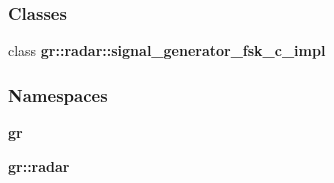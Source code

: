 \subsubsection*{Classes}
\begin{DoxyCompactItemize}
\item 
class {\bf gr\+::radar\+::signal\+\_\+generator\+\_\+fsk\+\_\+c\+\_\+impl}
\end{DoxyCompactItemize}
\subsubsection*{Namespaces}
\begin{DoxyCompactItemize}
\item 
 {\bf gr}
\item 
 {\bf gr\+::radar}
\end{DoxyCompactItemize}
